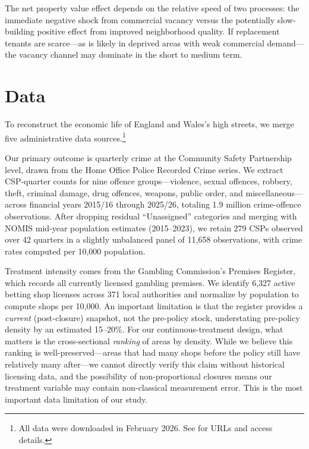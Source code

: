 \documentclass[12pt]{article}
\begin{document}
The net property value effect depends on the relative speed of two processes: the immediate negative shock from commercial vacancy versus the potentially slow-building positive effect from improved neighborhood quality. If replacement tenants are scarce---as is likely in deprived areas with weak commercial demand---the vacancy channel may dominate in the short to medium term.


\section{Data}
\label{sec:data}

To reconstruct the economic life of England and Wales's high streets, we merge five administrative data sources.\footnote{All data were downloaded in February 2026. See  for URLs and access details.}

Our primary outcome is quarterly crime at the Community Safety Partnership level, drawn from the Home Office Police Recorded Crime series. We extract CSP-quarter counts for nine offence groups---violence, sexual offences, robbery, theft, criminal damage, drug offences, weapons, public order, and miscellaneous---across financial years 2015/16 through 2025/26, totaling 1.9 million crime-offence observations. After dropping residual ``Unassigned'' categories and merging with NOMIS mid-year population estimates (2015--2023), we retain 279 CSPs observed over 42 quarters in a slightly unbalanced panel of 11,658 observations, with crime rates computed per 10,000 population.

Treatment intensity comes from the Gambling Commission's Premises Register, which records all currently licensed gambling premises. We identify 6,327 active betting shop licenses across 371 local authorities and normalize by population to compute shops per 10,000. An important limitation is that the register provides a \textit{current} (post-closure) snapshot, not the pre-policy stock, understating pre-policy density by an estimated 15--20\%. For our continuous-treatment design, what matters is the cross-sectional \textit{ranking} of areas by density. While we believe this ranking is well-preserved---areas that had many shops before the policy still have relatively many after---we cannot directly verify this claim without historical licensing data, and the possibility of non-proportional closures means our treatment variable may contain non-classical measurement error. This is the most important data limitation of our study.
\end{document}
